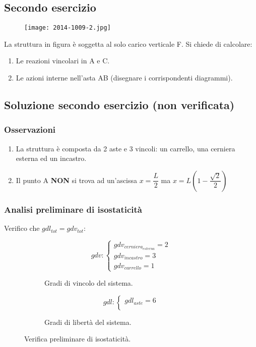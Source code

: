 \documentclass[main.tex]{subfiles}
\begin{document}
\subsection{Secondo esercizio}

\begin{figure}[H]
\centering
\texttt{[image: 2014-1009-2.jpg]}
\end{figure}

La struttura in figura è soggetta al solo carico verticale F. Si chiede di calcolare:

\begin{enumerate}
\item Le reazioni vincolari in A e C.
\item Le azioni interne nell’asta AB (disegnare i corrispondenti diagrammi).
\end{enumerate}

\clearpage

\subsection{Soluzione secondo esercizio (non verificata)}

\subsubsection{Osservazioni}

\begin{enumerate}
\item La struttura è composta da 2 aste e 3 vincoli: un carrello, una cerniera esterna ed un incastro.
\item Il punto A \textbf{NON} si trova ad un'ascissa $x = \dfrac{L}{2}$ ma $x = L(1-\dfrac{\sqrt{2}}{2})$
\end{enumerate}

\subsubsection{Analisi preliminare di isostaticità}
Verifico che $gdl_{tot} = gdv_{tot}$:
\begin{figure}[H]
  \begin{subfigure}[b]{.5\textwidth}
  \centering
  \[
  	gdv: \begin{cases}
		gdv_{cerniera_{esterna}} = 2\\
		gdv_{incastro} = 3\\
		gdv_{carrello} = 1
  	\end{cases}
  \]
  \caption{Gradi di vincolo del sistema.}
  \end{subfigure}
  \hfill
  \begin{subfigure}[b]{.5\textwidth}
  \centering
  \[
  	gdl: \begin{cases}
  		gdl_{aste} = 6\\
  	\end{cases}  
  \]
  \caption{Gradi di libertà del sistema.}
  \end{subfigure}
  \caption{Verifica preliminare di isostaticità.}
\end{figure}
\end{document}
